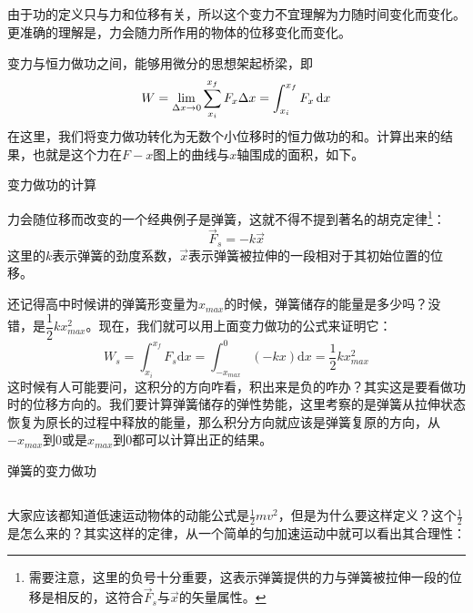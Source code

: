 \subsection[变力做功]{}
由于功的定义只与力和位移有关，所以这个变力不宜理解为力随时间变化而变化。更准确的理解是，力会随力所作用的物体的位移变化而变化。

变力与恒力做功之间，能够用微分的思想架起桥梁，即
\[W=\lim_{\Delta x \to 0} \sum_{x_{i}}^{x_{f}}F_{x}\Delta x=\int_{x_{i}}^{x_{f}}F_{x}\dif x\]
在这里，我们将变力做功转化为无数个小位移时的恒力做功的和。计算出来的结果，也就是这个力在$F-x$图上的曲线与$x$轴围成的面积，如下。
\begin{center}
	变力做功的计算
\end{center}
力会随位移而改变的一个经典例子是弹簧，这就不得不提到著名的胡克定律\footnote{需要注意，这里的负号十分重要，这表示弹簧提供的力与弹簧被拉伸一段的位移是相反的，这符合$\vec{F}_{s}$与$\vec{x}$的矢量属性。}：
\[\vec{F}_{s}=-k\vec{x}\]
这里的$k$表示弹簧的劲度系数，$\vec{x}$表示弹簧被拉伸的一段相对于其初始位置的位移。

还记得高中时候讲的弹簧形变量为$x_{max}$的时候，弹簧储存的能量是多少吗？没错，是$\dfrac{1}{2} kx_{max}^{2}$。现在，我们就可以用上面变力做功的公式来证明它：
\[W_{s}=\int_{x_{i}}^{x_{f}}F_{s}\mathrm{d}x=\int_{-x_{max}}^{0}(-kx)\mathrm{d}x=\frac{1}{2} kx_{max}^{2}\]
这时候有人可能要问，这积分的方向咋看，积出来是负的咋办？其实这是要看做功时的位移方向的。我们要计算弹簧储存的弹性势能，这里考察的是弹簧从拉伸状态恢复为原长的过程中释放的能量，那么积分方向就应该是弹簧复原的方向，从$-x_{max}$到$0$或是$x_{max}$到$0$都可以计算出正的结果。

\begin{center}
	弹簧的变力做功
\end{center}
\subsection[动能]{}
大家应该都知道低速运动物体的动能公式是$\frac{1}{2}mv^{2} $，但是为什么要这样定义？这个$\frac{1}{2}$是怎么来的？其实这样的定律，从一个简单的匀加速运动中就可以看出其合理性：

